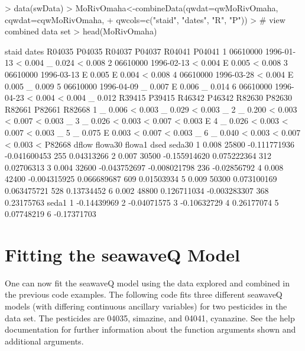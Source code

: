 \documentclass[11pt]{article}
\begin{document}
\begin{Schunk}
\begin{Sinput}
> data(swData)
> MoRivOmaha<-combineData(qwdat=qwMoRivOmaha, cqwdat=cqwMoRivOmaha,
+ qwcols=c("staid", "dates", "R", "P"))
> # view combined data set
> head(MoRivOmaha)
\end{Sinput}
\begin{Soutput}
     staid      dates R04035 P04035 R04037 P04037 R04041 P04041
1 06610000 1996-01-13      <  0.004      _  0.024      <  0.008
2 06610000 1996-02-13      <  0.004      E  0.005      <  0.008
3 06610000 1996-03-13      E  0.005      E  0.004      <  0.008
4 06610000 1996-03-28      <  0.004      E  0.005      _  0.009
5 06610000 1996-04-09      _  0.007      E  0.006      _  0.014
6 06610000 1996-04-23      <  0.004      <  0.004      _  0.012
  R39415 P39415 R46342 P46342 R82630 P82630 R82661 P82661 R82668
1      _  0.006      <  0.003      _  0.029      <  0.003      _
2      _  0.200      <  0.003      <  0.007      <  0.003      _
3      _  0.026      <  0.003      <  0.007      <  0.003      E
4      _  0.026      <  0.003      <  0.007      <  0.003      _
5      _  0.075      E  0.003      <  0.007      <  0.003      _
6      _  0.040      <  0.003      <  0.007      <  0.003      <
  P82668 dflow      flowa30       flowa1 dsed      seda30
1  0.008 25800 -0.111771936 -0.041600453  255  0.04313266
2  0.007 30500 -0.155914620  0.075222364  312  0.02706313
3  0.004 32600 -0.043752697 -0.008021798  236 -0.02856792
4  0.008 42400 -0.004315925  0.066689687  609  0.01503934
5  0.009 50300  0.073100169  0.063475721  528  0.13734452
6  0.002 48800  0.126711034 -0.003283307  368  0.23175763
        seda1
1 -0.14439969
2 -0.04071575
3 -0.10632729
4  0.26177074
5  0.07748219
6 -0.17371703
\end{Soutput}
\end{Schunk}

\section{Fitting the seawaveQ Model}

One can now fit the seawaveQ model using the data explored and combined in the previous code examples.  The following code fits three different seawaveQ models (with differing continuous ancillary variables) for two pesticides in the data set.  The pesticides are 04035, simazine, and 04041, cyanazine.  See the help documentation for further information about the function arguments shown and additional arguments.
\vspace{5 mm}
\end{document}
